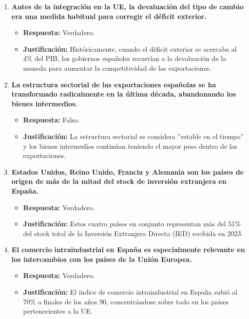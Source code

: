 \begin{enumerate}[label=\textbf{Pregunta \arabic*:}, leftmargin=*, itemsep=4ex]
\item \textbf{Antes de la integración en la UE, la devaluación del tipo de cambio era una medida habitual para corregir el déficit exterior.}
    \begin{itemize}
        \item \textbf{Respuesta:} \textcolor{blue!80!black}{Verdadero.}
        \item \textbf{Justificación:} Históricamente, cuando el déficit exterior se acercaba al 4\% del PIB, los gobiernos españoles recurrían a la devaluación de la moneda para aumentar la competitividad de las exportaciones.
    \end{itemize}

\item \textbf{La estructura sectorial de las exportaciones españolas se ha transformado radicalmente en la última década, abandonando los bienes intermedios.}
    \begin{itemize}
        \item \textbf{Respuesta:} \textcolor{red!80!black}{Falso.}
        \item \textbf{Justificación:} La estructura sectorial se considera ''estable en el tiempo'' y los bienes intermedios continúan teniendo el mayor peso dentro de las exportaciones.
    \end{itemize}

\item \textbf{Estados Unidos, Reino Unido, Francia y Alemania son los países de origen de más de la mitad del stock de inversión extranjera en España.}
    \begin{itemize}
        \item \textbf{Respuesta:} \textcolor{blue!80!black}{Verdadero.}
        \item \textbf{Justificación:} Estos cuatro países en conjunto representan más del 51\% del stock total de la Inversión Extranjera Directa (IED) recibida en 2023.
    \end{itemize}

\item \textbf{El comercio intraindustrial en España es especialmente relevante en los intercambios con los países de la Unión Europea.}
    \begin{itemize}
        \item \textbf{Respuesta:} \textcolor{blue!80!black}{Verdadero.}
        \item \textbf{Justificación:} El índice de comercio intraindustrial en España subió al 70\% a finales de los años 90, concentrándose sobre todo en los países pertenecientes a la UE.
    \end{itemize}


\end{enumerate}

